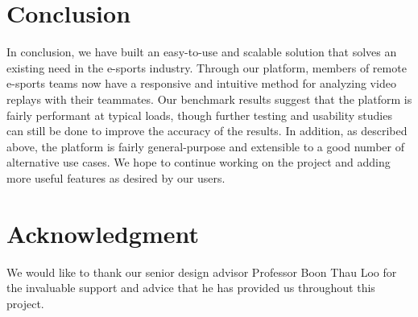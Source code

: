 \documentclass[conference]{IEEEtran}
\begin{document}
\section{Conclusion}

  In conclusion, we have built an easy-to-use and scalable solution that solves an existing need in the e-sports industry. Through our platform, members of remote e-sports teams now have a responsive and intuitive method for analyzing video replays with their teammates. Our benchmark results suggest that the platform is fairly performant at typical loads, though further testing and usability studies can still be done to improve the accuracy of the results. In addition, as described above, the platform is fairly general-purpose and extensible to a good number of alternative use cases. We hope to continue working on the project and adding more useful features as desired by our users.

\section*{Acknowledgment}
We would like to thank our senior design advisor Professor Boon Thau Loo for the invaluable support and advice that he has provided us throughout this project.



\end{document}
